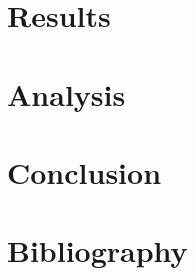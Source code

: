 \documentclass[12pt]{article}
\begin{document}
\section{Results}

\section{Analysis}

\section{Conclusion}

\section{Bibliography}
\end{document}
